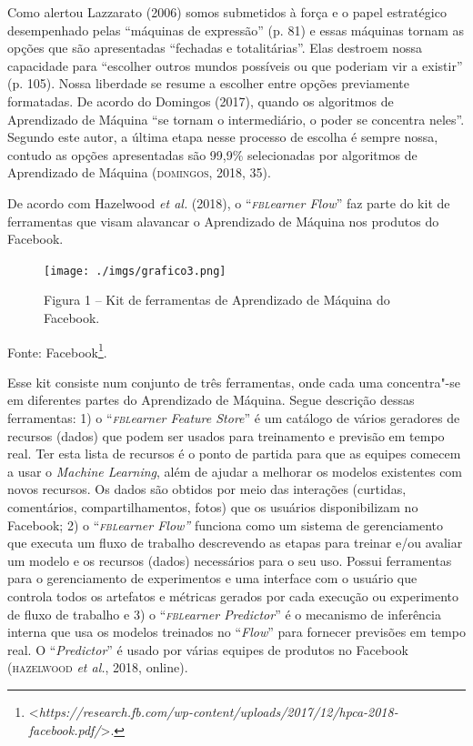 Como alertou Lazzarato (2006) somos submetidos à força e o papel
estratégico desempenhado pelas ``máquinas de expressão'' (p. 81) e essas
máquinas tornam as opções que são apresentadas ``fechadas e
totalitárias''. Elas destroem nossa capacidade para ``escolher outros
mundos possíveis ou que poderiam vir a existir'' (p. 105). Nossa
liberdade se resume a escolher entre opções previamente formatadas. De
acordo do Domingos (2017), quando os algoritmos de Aprendizado de
Máquina ``se tornam o intermediário, o poder se concentra neles''.
Segundo este autor, a última etapa nesse processo de escolha é sempre
nossa, contudo as opções apresentadas são 99,9\% selecionadas por
algoritmos de Aprendizado de Máquina (\textsc{domingos}, 2018, 35).

De acordo com Hazelwood \emph{et al.} (2018), o ``\emph{\textsc{fbl}earner Flow}'' faz
parte do kit de ferramentas que visam alavancar o Aprendizado de Máquina
nos produtos do Facebook.

\begin{figure}[!ht]
\texttt{[image: ./imgs/grafico3.png]}
\caption{Figura 1 -- Kit de ferramentas de Aprendizado de Máquina do Facebook.}
\end{figure}

Fonte: Facebook\footnote{\mbox{\textless{}\emph{https://research.fb.com/wp-content/uploads/2017/12/hpca-2018-facebook.pdf/}\textgreater{}.}}.

Esse kit consiste num conjunto de três ferramentas, onde cada uma
concentra"-se em diferentes partes do Aprendizado de Máquina. Segue
descrição dessas ferramentas: 1) o ``\emph{\textsc{fbl}earner Feature Store}'' é
um catálogo de vários geradores de recursos (dados) que podem ser usados
para treinamento e previsão em tempo real. Ter esta lista de recursos é
o ponto de partida para que as equipes comecem a usar o \emph{Machine
Learning}, além de ajudar a melhorar os modelos existentes com novos
recursos. Os dados são obtidos por meio das interações (curtidas,
comentários, compartilhamentos, fotos) que os usuários disponibilizam no
Facebook; 2) o ``\emph{\textsc{fbl}earner Flow''} funciona como um sistema de
gerenciamento que executa um fluxo de trabalho descrevendo as etapas
para treinar e/ou avaliar um modelo e os recursos (dados) necessários
para o seu uso. Possui ferramentas para o gerenciamento de experimentos
e uma interface com o usuário que controla todos os artefatos e métricas
gerados por cada execução ou experimento de fluxo de trabalho e 3) o
``\emph{\textsc{fbl}earner Predictor}'' é o mecanismo de inferência interna que
usa os modelos treinados no ``\emph{Flow}'' para fornecer previsões em
tempo real. O ``\emph{Predictor}'' é usado por várias equipes de
produtos no Facebook (\textsc{hazelwood} \emph{et al.}, 2018, online).

